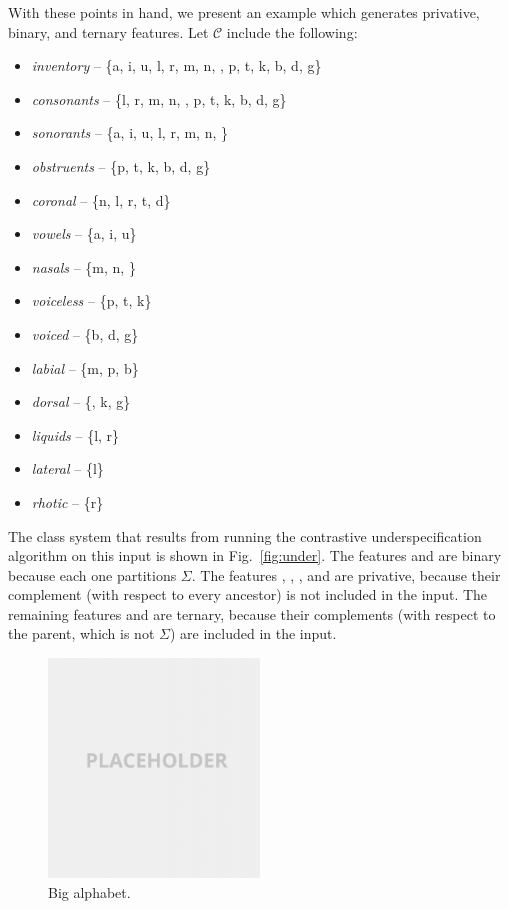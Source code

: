 \documentclass[11pt, oneside]{article}   	%
\begin{document}
\vspace{\baselineskip} With these points in hand, we present an example which generates privative, binary, and ternary features. Let $\mathcal C$ include the following: \begin{itemize}
    \item \textit{inventory} -- \{a, i, u, l, r, m, n, , p, t, k, b, d, g\}
    \item \textit{consonants} -- \{l, r, m, n, , p, t, k, b, d, g\}
    \item \textit{sonorants} -- \{a, i, u, l, r, m, n, \}
    \item \textit{obstruents} -- \{p, t, k, b, d, g\}
    \item \textit{coronal} -- \{n, l, r, t, d\}
    \item \textit{vowels} -- \{a, i, u\}
    \item \textit{nasals} -- \{m, n, \}
    \item \textit{voiceless} -- \{p, t, k\}
    \item \textit{voiced} -- \{b, d, g\}
    \item \textit{labial} -- \{m, p, b\}
    \item \textit{dorsal} -- \{, k, g\}
    \item \textit{liquids} -- \{l, r\}
    \item \textit{lateral} -- \{l\}
    \item \textit{rhotic} -- \{r\}
    \end{itemize}
The class system that results from running the contrastive underspecification algorithm on this input is shown in Fig.~\ref{fig:under}. The features  and  are binary because each one partitions $\Sigma$. The features , , ,  and  are privative, because their complement (with respect to every ancestor) is not included in the input. The remaining features  and  are ternary, because their complements (with respect to the parent, which is not $\Sigma$) are included in the input.

\begin{figure}[h]
  \centering
  \includegraphics[width=0.5\textwidth]{placeholder.png}
  \caption{Big alphabet.}
  \label{fig:big_alphabet}
\end{figure}
\end{document}
